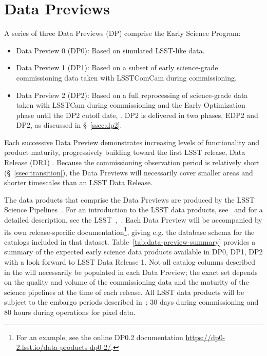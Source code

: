 \section{Data Previews}
\label{sec:datapreview}

A series of three Data Previews (DP) comprise the Early Science Program:
\begin{itemize}
\item Data Preview 0 (DP0): Based on simulated LSST-like data.
\item Data Preview 1 (DP1): Based on a subset of early science-grade commissioning data taken with LSSTComCam during commissioning.
\item Data Preview 2 (DP2): Based on a full reprocessing of science-grade data taken with LSSTCam during commissioning and the Early Optimization phase until  the DP2 cutoff date, \dptwocutoffdate.
DP2 is delivered in two phases, EDP2 and DP2, as discussed in \S~\ref{ssec:dp2}.
\end{itemize}
Each successive Data Preview demonstrates increasing levels of functionality and product maturity, progressively building toward the first LSST release,  Data Release (DR1) \cite{RDO-011}.
Because the commissioning observation period is relatively short (\S~\ref{ssec:transition}), the Data Previews will necessarily cover smaller areas and shorter timescales than an LSST Data Release.

The data products that comprise the Data Previews are produced by the LSST Science Pipelines~\citep[][]{PSTN-019}.
For an introduction to the LSST data products, see~\citet[][]{RubinDataProductsAbridged} and for a detailed description, see the LSST~\dpdd,~.
Each Data Preview will be accompanied by its own release-specific documentation\footnote{For an example, see the online DP0.2 documentation {\url{https://dp0-2.lsst.io/data-products-dp0-2/}}.}, giving e.g. the  database schema for the catalogs included in that dataset.
Table~\ref{tab:data-preview-summary} provides a summary of the expected early science data products available in DP0, DP1, DP2 with a look forward to LSST Data Release 1.
Not all catalog columns described in the \dpdd will necessarily be populated in each Data Preview; the exact set depends on the quality and volume of the commissioning data and the maturity of the science pipelines at the time of each release.
All LSST data products will be subject to the embargo periods described in~; 30 days during commissioning and 80 hours during operations for pixel data.


